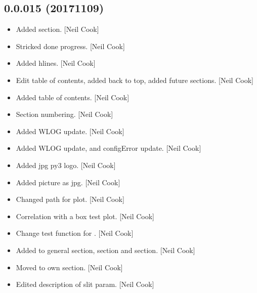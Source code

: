 \documentclass[a4paper,10pt,english]{report}
\begin{document}
\subsection{0.0.015 (2017\sphinxhyphen{}11\sphinxhyphen{}09)}
\label{\detokenize{misc/changelog:id555}}\begin{itemize}
\item {} 
Added  section. {[}Neil Cook{]}

\item {} 
Stricked done progress. {[}Neil Cook{]}

\item {} 
Added hlines. {[}Neil Cook{]}

\item {} 
Edit table of contents, added back to top, added future sections.
{[}Neil Cook{]}

\item {} 
Added table of contents. {[}Neil Cook{]}

\item {} 
Section numbering. {[}Neil Cook{]}

\item {} 
Added WLOG update. {[}Neil Cook{]}

\item {} 
Added WLOG update, and configError update. {[}Neil Cook{]}

\item {} 
Added jpg py3 logo. {[}Neil Cook{]}

\item {} 
Added picture as jpg. {[}Neil Cook{]}

\item {} 
Changed path for plot. {[}Neil Cook{]}

\item {} 
Correlation with a box test plot. {[}Neil Cook{]}

\item {} 
Change test function for . {[}Neil Cook{]}

\item {} 
Added to general section,  section and  section. {[}Neil
Cook{]}

\item {} 
Moved  to own section. {[}Neil Cook{]}

\item {} 
Edited description of slit param. {[}Neil Cook{]}

\end{itemize}
\end{document}
